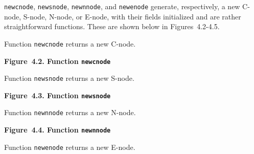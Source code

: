 \documentclass{article}
\begin{document}
\texttt{newcnode}, \texttt{newsnode}, \texttt{newnnode}, and
\texttt{newenode} generate, respectively, a new C-node, S-node,
N-node, or E-node, with their fields initialized and are rather
straightforward functions. These are shown below in
Figures~4.2-4.5.

Function \texttt{newcnode} returns a new C-node.

\bigbreak
\begin{minipage}{\textwidth}
\vbox{}
\bigbreak
{}
\textbf{Figure~4.2. Function \texttt{newcnode}}
\end{minipage}
\bigbreak

Function \texttt{newsnode} returns a new S-node.

\bigbreak
\begin{minipage}{\textwidth}
\vbox{}
\bigbreak
{}
\textbf{Figure~4.3. Function \texttt{newsnode}}
\end{minipage}
\bigbreak

Function \texttt{newnnode} returns a new N-node.

\bigbreak
\begin{minipage}{\textwidth}
\vbox{}
\bigbreak
{}
\textbf{Figure~4.4. Function \texttt{newnnode}}
\end{minipage}
\bigbreak

Function \texttt{newenode} returns a new E-node.
\end{document}
